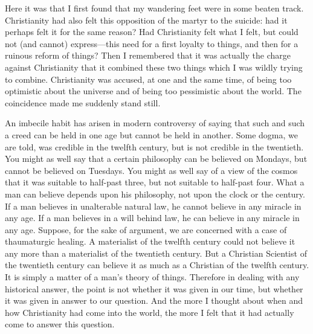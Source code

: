 Here it was that I first found that my wandering feet were in some beaten track. Christianity had also felt this opposition of the martyr to the suicide: had it perhaps felt it for the same reason? Had Christianity felt what I felt, but could not (and cannot) express—this need for a first loyalty to things, and then for a ruinous reform of things? Then I remembered that it was actually the charge against Christianity that it combined these two things which I was wildly trying to combine. Christianity was accused, at one and the same time, of being too optimistic about the universe and of being too pessimistic about the world. The coincidence made me suddenly stand still.

An imbecile habit has arisen in modern controversy of saying that such and such a creed can be held in one age but cannot be held in another. Some dogma, we are told, was credible in the twelfth century, but is not credible in the twentieth. You might as well say that a certain philosophy can be believed on Mondays, but cannot be believed on Tuesdays. You might as well say of a view of the cosmos that it was suitable to half-past three, but not suitable to half-past four. What a man can believe depends upon his philosophy, not upon the clock or the century. If a man believes in unalterable natural law, he cannot believe in any miracle in any age. If a man believes in a will behind law, he can believe in any miracle in any age. Suppose, for the sake of argument, we are concerned with a case of thaumaturgic healing. A materialist of the twelfth century could not believe it any more than a materialist of the twentieth century. But a Christian Scientist of the twentieth century can believe it as much as a Christian of the twelfth century. It is simply a matter of a man’s theory of things. Therefore in dealing with any historical answer, the point is not whether it was given in our time, but whether it was given in answer to our question. And the more I thought about when and how Christianity had come into the world, the more I felt that it had actually come to answer this question.

